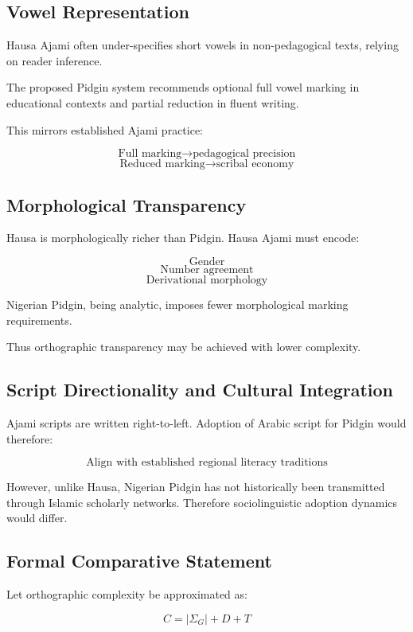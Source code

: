 \documentclass[12pt]{article}
\begin{document}
\subsection{Vowel Representation}

Hausa Ajami often under-specifies short vowels in non-pedagogical texts, relying on reader inference.

The proposed Pidgin system recommends optional full vowel marking in educational contexts and partial reduction in fluent writing.

This mirrors established Ajami practice:

\[
\text{Full marking} \rightarrow \text{pedagogical precision}
\]
\[
\text{Reduced marking} \rightarrow \text{scribal economy}
\]

\subsection{Morphological Transparency}

Hausa is morphologically richer than Pidgin. Hausa Ajami must encode:

\[
\text{Gender}
\]
\[
\text{Number agreement}
\]
\[
\text{Derivational morphology}
\]

Nigerian Pidgin, being analytic, imposes fewer morphological marking requirements.

Thus orthographic transparency may be achieved with lower complexity.

\subsection{Script Directionality and Cultural Integration}

Ajami scripts are written right-to-left. Adoption of Arabic script for Pidgin would therefore:

\[
\text{Align with established regional literacy traditions}
\]

However, unlike Hausa, Nigerian Pidgin has not historically been transmitted through Islamic scholarly networks. Therefore sociolinguistic adoption dynamics would differ.

\subsection{Formal Comparative Statement}

Let orthographic complexity be approximated as:

\[
C = |\Sigma_G| + D + T
\]
\end{document}
